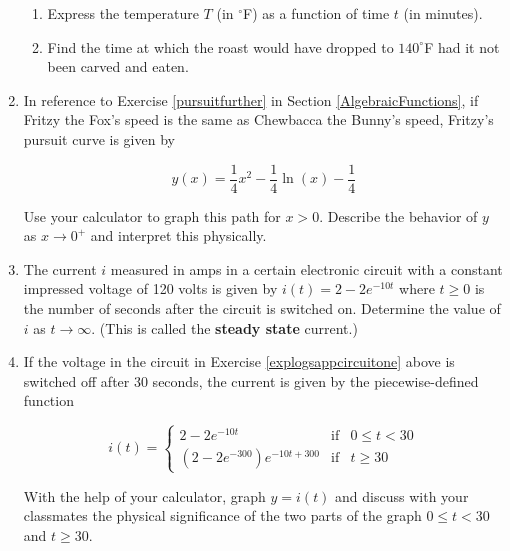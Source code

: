\begin{enumerate}
\begin{enumerate}

\item Express the temperature $T$ (in $^{\circ}$F) as a function of time $t$ (in minutes).

\item Find the time at which the roast would have dropped to $140^{\circ}$F had it not been carved and eaten. 

\end{enumerate}

\item  \label{pursuitlog} In reference to Exercise \ref{pursuitfurther} in Section \ref{AlgebraicFunctions}, if Fritzy the Fox's speed is the same as Chewbacca the Bunny's speed, Fritzy's pursuit curve is given by

\[y(x) = \frac{1}{4} x^2-\frac{1}{4} \ln(x)-\frac{1}{4}\]

Use your calculator to graph this path for $x > 0$.  Describe the behavior of $y$ as $x \rightarrow 0^{+}$ and interpret this physically.

\item \label{explogsappcircuitone} The current $i$ measured in amps in a certain electronic circuit with a constant impressed voltage of 120 volts is given by $i(t) = 2 - 2e^{-10t}$ where $t \geq 0$ is the number of seconds after the circuit is switched on.  Determine the value of $i$ as $t \rightarrow \infty$.  (This is called the \textbf{steady state} current.)


\item If the voltage in the circuit in Exercise \ref{explogsappcircuitone} above is switched off after 30 seconds, the current is given by the piecewise-defined function 

\[i(t) = \left\{ \begin{array}{rcl} 2 - 2e^{-10t} & \mbox{if} & 0 \leq t < 30 \\ [6pt]
\left(2 - 2e^{-300}\right) e^{-10t+300} & \mbox{if} & t \geq 30 \end{array} \right.\]  

With the help of your calculator, graph $y = i(t)$ and discuss with your classmates the physical significance of the two parts of the graph $0 \leq t < 30$ and $t \geq 30$.


\end{enumerate}
